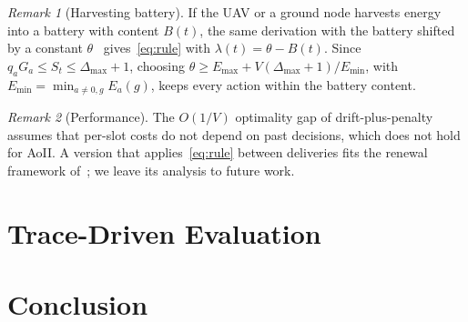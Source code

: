 \documentclass[conference]{IEEEtran}
\theoremstyle{remark}
\newtheorem{remark}{Remark}
\begin{document}
\begin{remark}[Harvesting battery]
If the UAV or a ground node harvests energy into a battery with content $B(t)$, the same derivation with the battery shifted by a constant $\theta$~\cite{huang2013eh} gives~\eqref{eq:rule} with $\lambda(t)=\theta-B(t)$. Since $q_aG_a\le S_t\le\Delta_{\max}+1$, choosing $\theta\ge E_{\max}+V(\Delta_{\max}+1)/E_{\min}$, with $E_{\min}=\min_{a\neq0,g}E_a(g)$, keeps every action within the battery content.
\end{remark}

\begin{remark}[Performance]
The $O(1/V)$ optimality gap of drift-plus-penalty~\cite{neely2010book} assumes that per-slot costs do not depend on past decisions, which does not hold for AoII. A version that applies~\eqref{eq:rule} between deliveries fits the renewal framework of~\cite{neely2013renewal}; we leave its analysis to future work.
\end{remark}

\section{Trace-Driven Evaluation}\label{sec:results}


\section{Conclusion}\label{sec:concl}




\end{document}
